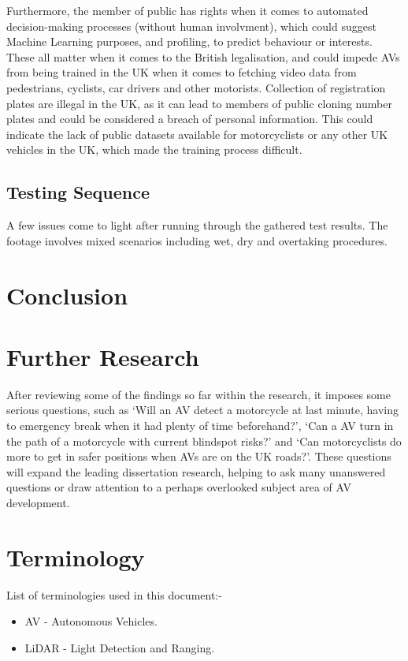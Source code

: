 \documentclass[conference]{IEEEtran}
\begin{document}
		Furthermore, the member of public has rights when it comes to automated decision-making processes (without human involvment), which could suggest Machine Learning purposes, and profiling, to predict behaviour or interests. These all matter when it comes to the British legalisation, and could impede AVs from being trained in the UK when it comes to fetching video data from pedestrians, cyclists, car drivers and other motorists. Collection of registration plates are illegal in the UK, as it can lead to members of public cloning number plates and could be considered a breach of personal information. This could indicate the lack of public datasets available for motorcyclists or any other UK vehicles in the UK, which made the training process difficult.
	\subsection{Testing Sequence}
		A few issues come to light after running through the gathered test results. The footage involves mixed scenarios including wet, dry and overtaking procedures. 
\section{Conclusion}

\section{Further Research}
	After reviewing some of the findings so far within the research, it imposes some serious questions, such as `Will an AV detect a motorcycle at last minute, having to emergency break when it had plenty of time beforehand?', `Can a AV turn in the path of a motorcycle with current blindspot risks?' and `Can motorcyclists do more to get in safer positions when AVs are on the UK roads?'. These questions will expand the leading dissertation research, helping to ask many unanswered questions or draw attention to a perhaps overlooked subject area of AV development.

\section{Terminology}
	List of terminologies used in this document:-
	\begin{itemize}
		\item AV - Autonomous Vehicles.
		\item LiDAR - Light Detection and Ranging.
	\end{itemize}

\renewcommand\refname{\section{Reference List}}
\small{
	}
\end{document}
